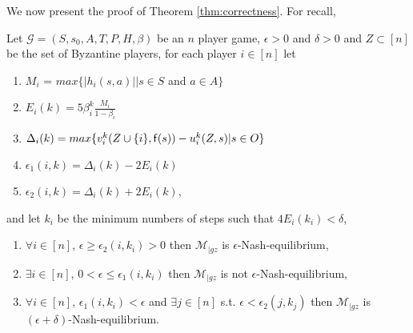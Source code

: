 We now present the proof of Theorem \ref{thm:correctness}. For recall,
\begin{theorem}%
	Let $\mathcal{G}=(S, s_0, A, T, P, H, \beta)$ be an $n$ player game, $ \epsilon > 0$ and $\delta > 0$ and $Z \subset [n]$ be the set of Byzantine players, for each player $i \in [n]$ let 
	\begin{enumerate}
		\item $M_i$ = $max \{|h_i(s,a)| | s \in S$ and $a \in A\}$
		\item $E_i(k) = 5\beta_i^{k} \frac{M_i}{1-\beta_i}$
		\item $\Delta_i(k)=max\{v_i^{k}(Z \cup \{i\},{\sf f}(s))- u_i^{k}(Z,s)|s\in O \}$
		\item $\epsilon_1(i,k) = \Delta_i(k) - 2E_i(k)$
		\item $\epsilon_2(i,k) = \Delta_i(k) + 2E_i(k)$,
	\end{enumerate}
	and let $k_i$ be the minimum numbers of steps such that $4E_i(k_i) < \delta$,
	\begin{enumerate}
		\item {} $\forall i \in [n]$, $\epsilon \ge \epsilon_2(i,k_i) > 0$ then $\mathcal{M}_{|gz}$ is $\epsilon$-Nash-equilibrium,
		\item {} $\exists i \in [n]$, $0 < \epsilon \le \epsilon_1(i,k_i)$ then $\mathcal{M}_{|gz}$ is not $\epsilon$-Nash-equilibrium,
		\item {} $\forall i \in [n]$, $\epsilon_1(i,k_i) < \epsilon$ and $\exists j \in [n]$ s.t. $\epsilon < \epsilon_2(j,k_j)$ then $\mathcal{M}_{|gz}$ is $(\epsilon + \delta)$-Nash-equilibrium.
	\end{enumerate}
\end{theorem}

